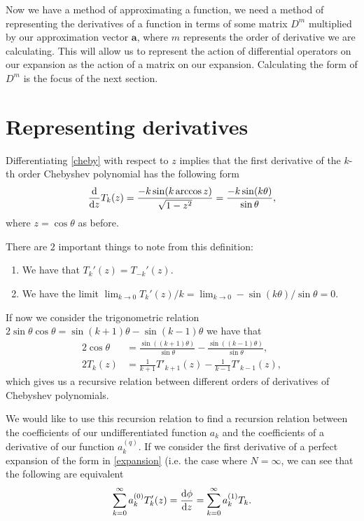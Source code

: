 Now we have a method of approximating a function, we need a method of representing the derivatives of a function in terms of some matrix $ D^m $ multiplied by our approximation vector $ \mathbf{a} $, where $m $ represents the order of derivative we are calculating. This will allow us to represent the action of differential operators on our expansion as the action of a matrix on our expansion. Calculating the form of $ D^m$ is the focus of the next section.

\section{Representing derivatives} \label{section:deriv}

Differentiating \eqref{cheby} with respect to $ z $ implies that the first derivative of the $k$-th order Chebyshev polynomial has the following form
\begin{equation}
    \dv{z} T_k(z) = \frac{-k \sin(k \arccos z)}{\sqrt{1 - z^2}} = \frac{-k \sin(k \theta)}{\sin \theta}, 
\label{chebyderiv}
\end{equation}
where $ z = \cos \theta $ as before. 

There are $ 2 $ important things to note from this definition:
\begin{enumerate}
    \item We have that $ T_k'(z) = T_{-k}'(z) $.
    \item We have the limit $ \lim_{k \rightarrow 0} T_k'(z) / k = \lim_{k \rightarrow 0} -\sin(k \theta) / \sin \theta = 0 $.
    \label{divprops}
\end{enumerate}

If  now we consider the trigonometric relation $ 2 \sin \theta \cos \theta = \sin(k+1)\theta - \sin(k-1)\theta $ we have that 
\begin{align}
    2 \cos \theta &= \frac{\sin((k+1) \theta)}{\sin \theta} - \frac{\sin((k-1) \theta)}{\sin \theta}, \\
    2 T_k(z) &= \frac{1}{k+1} T'_{k+1}(z) - \frac{1}{k-1}T'_{k-1}(z),
    \label{chebrelation}
\end{align}
which gives us a recursive relation between different orders of derivatives of Chebyshev polynomials. 

We would like to use this recursion relation to find a recursion relation between the coefficients of our undifferentiated function $ a_k$ and the coefficients of a derivative of our function $ a_k^{(q)} $. If we consider the first derivative of a perfect expansion of the form in \eqref{expansion} (i.e. the case where $ N = \infty $, we can see that the following are equivalent
\begin{equation}
    \sum^\infty_{k=0} a^{(0)}_k T_k' (z) = \dv{\phi}{z} = \sum^\infty_{k = 0} a_k^{(1)} T_k.
\end{equation}

